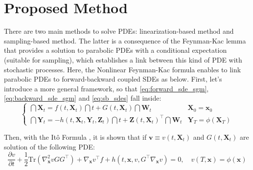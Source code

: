 \documentclass{article}
\begin{document}
\section{Proposed Method}

There are two main methods to solve PDEs: linearization-based method and sampling-based method. The latter is a consequence of the Feynman-Kac lemma that provides a solution to parabolic PDEs with a conditional expectation (suitable for sampling), which establishes a link between this kind of PDE with stochastic processes. Here, the Nonlinear Feynman-Kac formula enables to link parabolic PDEs to forward-backward coupled SDEs as below. First, let's introduce a more general framework, so that \eqref{eq:forward_sde_sgm}, \eqref{eq:backward_sde_sgm} and \eqref{eq:sb_sdes} fall inside:
\begin{equation}
    \label{eq:general_sdes}
    \begin{cases}
    \dint\mathbf{X}_t  = f(t,\mathbf{X}_t)\dint t + G(t,\mathbf{X}_t)\dint\mathbf{W}_t
    & \mathbf{X}_0 =\mathbf{x}_0 \\[5pt]
    \dint\mathbf{Y}_t = - h(t,\mathbf{X}_t, \mathbf{Y}_t,\mathbf{Z}_t)\dint t + \mathbf{Z}(t,\mathbf{X}_t)^\top \dint\mathbf{W}_t
    & \mathbf{Y}_T = \phi(\mathbf{X}_T)
    \end{cases}
\end{equation}


Then, with the Itô Formula \citep{EXARCHOS2018159}, it is shown that if $\mathbf{v} \equiv v(t,\mathbf{X}_t)$ and $G(t,\mathbf{X}_t)$ are solution of the following PDE:
\begin{equation}
\label{eq:general_pde}
\frac{\partial v}{\partial t}
+ \frac{1}{2}\mathrm{Tr}(\nabla_\mathbf{x}^2 vGG^\top)
+ \nabla_\mathbf{x}v^\top f
+ h(t,\mathbf{x},v,G^\top\nabla_\mathbf{x}v)
= 0, \quad v(T,\mathbf{x}) = \phi(\mathbf{x})
\end{equation}
\end{document}
